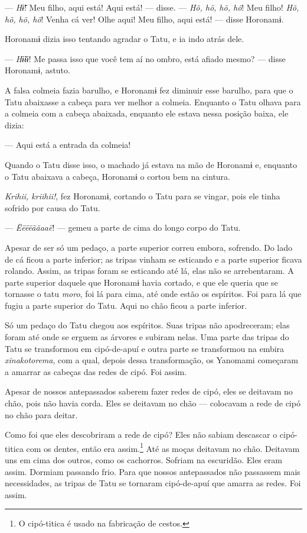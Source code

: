 --- \textit{Hɨ̃}! Meu filho, aqui está! Aqui está! --- disse. --- \textit{Hõ, hõ, hõ,
hõ}! Meu filho! \textit{Hõ, hõ, hõ, hõ}! Venha cá ver! Olhe aqui! Meu filho, aqui
está! --- disse Horonamɨ. 

Horonamɨ dizia isso tentando agradar o Tatu, e ia indo atrás dele.

--- \textit{Hɨ̃ɨɨ}! Me passa isso que você tem aí no ombro, está afiado
mesmo? --- disse Horonamɨ, astuto. 

A falsa colmeia fazia barulho, e Horonamɨ fez diminuir esse barulho,
para que o Tatu abaixasse a cabeça para ver melhor a colmeia. Enquanto o
Tatu olhava para a colmeia com a cabeça abaixada, enquanto ele estava
nessa posição baixa, ele dizia:

--- Aqui está a entrada da colmeia! 

Quando o Tatu disse isso, o machado já estava na mão de Horonamɨ e,
enquanto o Tatu abaixava a cabeça, Horonamɨ o cortou bem na cintura. 

\textit{Krihii, kriihii!}, fez Horonamɨ, cortando o Tatu para se vingar, pois
ele tinha sofrido por causa do Tatu. 

--- \textit{Ëëëëããaaë}! --- gemeu a parte de cima do longo corpo do Tatu.

Apesar de ser só um pedaço, a parte superior correu embora, sofrendo. Do
 lado de cá ficou a parte inferior; as tripas vinham se esticando e a
 parte superior ficava rolando. Assim, as tripas foram se esticando até
 lá, elas não se arrebentaram. A parte superior daquele que Horonamɨ
 havia cortado, e que ele queria que se tornasse o tatu \textit{moro}, foi
 lá para cima, até onde estão os espíritos. Foi para lá que fugiu a parte
 superior do Tatu. Aqui no chão ficou a parte inferior.

Só um pedaço do Tatu chegou aos espíritos. Suas tripas não apodreceram;
elas foram até onde se erguem as árvores e subiram nelas. Uma parte das
tripas do Tatu se transformou em cipó-de-apuí e outra parte se
transformou na embira \textit{xinakotorema}, com a qual, depois dessa
transformação, os Yanomami começaram a amarrar as cabeças das redes de
cipó. Foi assim.

Apesar de nossos antepassados saberem fazer redes de cipó, eles se
deitavam no chão, pois não havia corda. Eles se deitavam no chão ---
colocavam a rede de cipó no chão para deitar. 

Como foi que eles descobriram a rede de cipó? Eles não sabiam descascar
o cipó-titica com os dentes, então era assim.\footnote{O cipó-titica é usado na fabricação de cestos.}
Até as
moças deitavam no chão. Deitavam uns em cima dos outros, como os
cachorros. Sofriam na escuridão. Eles eram assim. Dormiam passando frio.
Para que nossos antepassados não passassem mais necessidades, as tripas
de Tatu se tornaram cipó-de-apuí que amarra as redes. Foi assim. 

